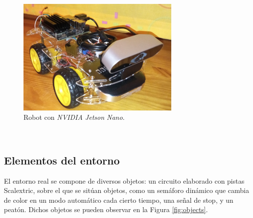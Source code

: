 \begin{figure} [h!]
	\begin{center}
		\includegraphics[width=8cm]{figs/robot}
	\end{center}
	\caption{Robot con \textit{NVIDIA Jetson Nano}.}
	\label{fig:realrobot}
\end{figure}\

\subsection{Elementos del entorno}
El entorno real se compone de diversos objetos: un circuito elaborado con pistas Scalextric, sobre el que se sitúan objetos, como un semáforo dinámico que cambia de color en un modo automático cada cierto tiempo, una señal de stop, y un peatón. Dichos objetos se pueden observar en la Figura \ref{fig:objects}.\\

